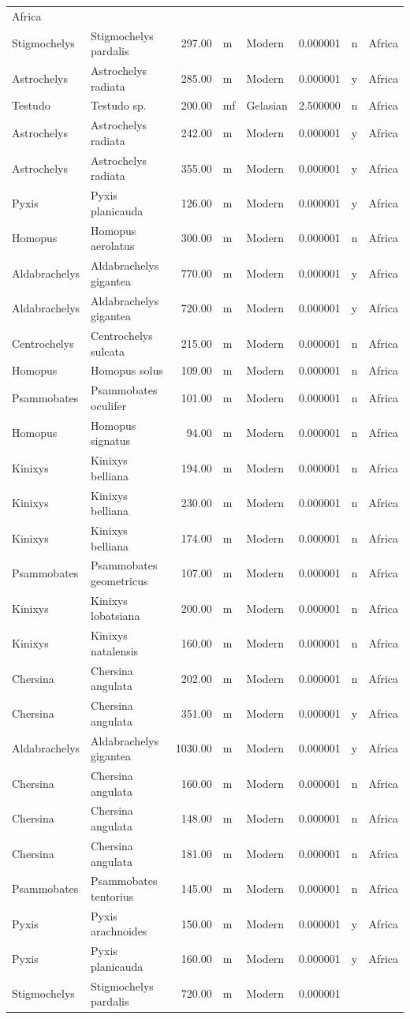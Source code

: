 \documentclass[]{article}
\begin{document}
\begin{longtable}[]{@{}llrllrll@{}}
Africa\tabularnewline
Stigmochelys & Stigmochelys pardalis & 297.00 & m & Modern & 0.000001 &
n & Africa\tabularnewline
Astrochelys & Astrochelys radiata & 285.00 & m & Modern & 0.000001 & y &
Africa\tabularnewline
Testudo & Testudo sp. & 200.00 & mf & Gelasian & 2.500000 & n &
Africa\tabularnewline
Astrochelys & Astrochelys radiata & 242.00 & m & Modern & 0.000001 & y &
Africa\tabularnewline
Astrochelys & Astrochelys radiata & 355.00 & m & Modern & 0.000001 & y &
Africa\tabularnewline
Pyxis & Pyxis planicauda & 126.00 & m & Modern & 0.000001 & y &
Africa\tabularnewline
Homopus & Homopus aerolatus & 300.00 & m & Modern & 0.000001 & n &
Africa\tabularnewline
Aldabrachelys & Aldabrachelys gigantea & 770.00 & m & Modern & 0.000001
& y & Africa\tabularnewline
Aldabrachelys & Aldabrachelys gigantea & 720.00 & m & Modern & 0.000001
& y & Africa\tabularnewline
Centrochelys & Centrochelys sulcata & 215.00 & m & Modern & 0.000001 & n
& Africa\tabularnewline
Homopus & Homopus solus & 109.00 & m & Modern & 0.000001 & n &
Africa\tabularnewline
Psammobates & Psammobates oculifer & 101.00 & m & Modern & 0.000001 & n
& Africa\tabularnewline
Homopus & Homopus signatus & 94.00 & m & Modern & 0.000001 & n &
Africa\tabularnewline
Kinixys & Kinixys belliana & 194.00 & m & Modern & 0.000001 & n &
Africa\tabularnewline
Kinixys & Kinixys belliana & 230.00 & m & Modern & 0.000001 & n &
Africa\tabularnewline
Kinixys & Kinixys belliana & 174.00 & m & Modern & 0.000001 & n &
Africa\tabularnewline
Psammobates & Psammobates geometricus & 107.00 & m & Modern & 0.000001 &
n & Africa\tabularnewline
Kinixys & Kinixys lobatsiana & 200.00 & m & Modern & 0.000001 & n &
Africa\tabularnewline
Kinixys & Kinixys natalensis & 160.00 & m & Modern & 0.000001 & n &
Africa\tabularnewline
Chersina & Chersina angulata & 202.00 & m & Modern & 0.000001 & n &
Africa\tabularnewline
Chersina & Chersina angulata & 351.00 & m & Modern & 0.000001 & y &
Africa\tabularnewline
Aldabrachelys & Aldabrachelys gigantea & 1030.00 & m & Modern & 0.000001
& y & Africa\tabularnewline
Chersina & Chersina angulata & 160.00 & m & Modern & 0.000001 & n &
Africa\tabularnewline
Chersina & Chersina angulata & 148.00 & m & Modern & 0.000001 & n &
Africa\tabularnewline
Chersina & Chersina angulata & 181.00 & m & Modern & 0.000001 & n &
Africa\tabularnewline
Psammobates & Psammobates tentorius & 145.00 & m & Modern & 0.000001 & n
& Africa\tabularnewline
Pyxis & Pyxis arachnoides & 150.00 & m & Modern & 0.000001 & y &
Africa\tabularnewline
Pyxis & Pyxis planicauda & 160.00 & m & Modern & 0.000001 & y &
Africa\tabularnewline
Stigmochelys & Stigmochelys pardalis & 720.00 & m & Modern & 0.000001 &

\end{longtable}
\end{document}
